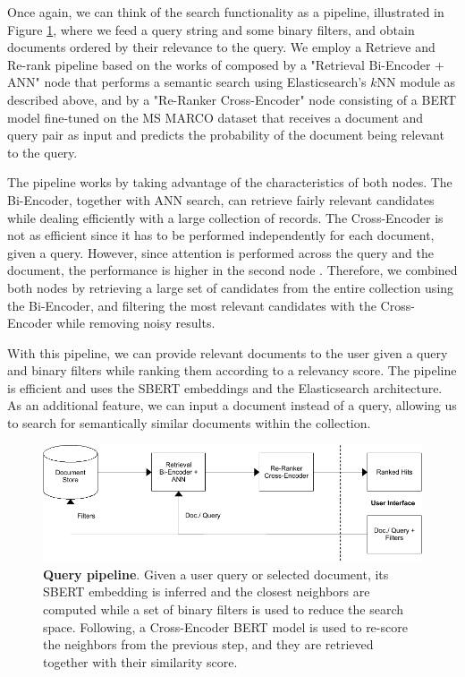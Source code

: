 \documentclass[a4paper]{article}
\begin{document}
Once again, we can think of the search functionality as a pipeline, illustrated in Figure \ref{query_pipeline}, where we feed a query string and some binary filters, and obtain documents ordered by their relevance to the query. We employ a Retrieve and Re-rank pipeline based on the works of \citet{nogueira2020a, kratzwald2019} composed by a "Retrieval Bi-Encoder + ANN" node that performs a semantic search using Elasticsearch’s $k$NN module as described above, and by a "Re-Ranker Cross-Encoder" node consisting of a BERT model fine-tuned on the MS MARCO dataset that receives a document and query pair as input and predicts the probability of the document being relevant to the query.

The pipeline works by taking advantage of the characteristics of both nodes. The Bi-Encoder, together with ANN search, can retrieve fairly relevant candidates while dealing efficiently with a large collection of records. The Cross-Encoder is not as efficient since it has to be performed independently for each document, given a query. However, since attention is performed across the query and the document, the performance is higher in the second node \citep{humeau2019}. Therefore, we combined both nodes by retrieving a large set of candidates from the entire collection using the Bi-Encoder, and filtering the most relevant candidates with the Cross-Encoder while removing noisy results.

With this pipeline, we can provide relevant documents to the user given a query and binary filters while ranking them according to a relevancy score. The pipeline is efficient and uses the SBERT embeddings and the Elasticsearch architecture. As an additional feature, we can input a document instead of a query, allowing us to search for semantically similar documents within the collection.

\begin{figure}[H]
	\centering
	\includegraphics[width=\linewidth]{./assets/query_pipeline}
	\caption{\textbf{Query pipeline}. Given a user query or selected document, its SBERT embedding is inferred and the closest neighbors are computed while a set of binary filters is used to reduce the search space. Following, a Cross-Encoder BERT model is used to re-score the neighbors from the previous step, and they are retrieved together with their similarity score.}
	\label{query_pipeline}
\end{figure}
\end{document}
